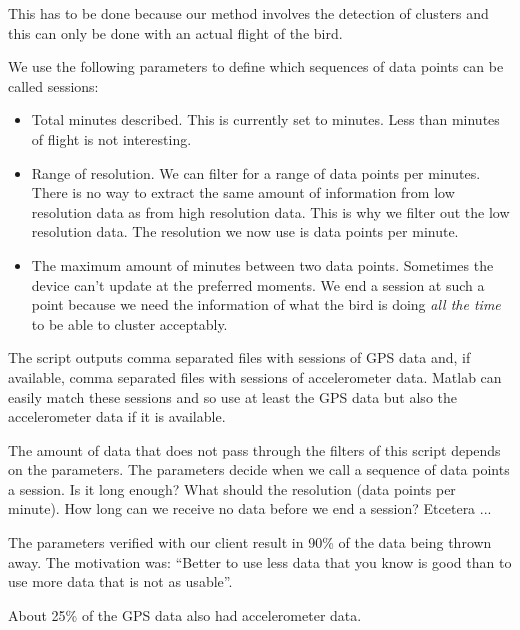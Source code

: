 This has to be done because our method involves the detection of clusters and this
can only be done with an actual flight of the bird. 

We use the following parameters to define which sequences of data points can be called sessions: 
\begin{itemize}
    \item Total minutes described. This is currently set to \minimumSessionLengthMinutes minutes. Less than \minimumSessionLengthMinutes minutes of flight is not interesting.
    \item Range of resolution. We can filter for a range of data points per minutes. There is
no way to extract the same amount of information from low resolution data as from high 
resolution data. This is why we filter out the low resolution data. The resolution 
we now use is \resolutionRange data points per minute.
    \item The maximum amount of minutes between two data points. Sometimes the device
can't update at the preferred moments. We end a session at such a point because we need
the information of what the bird is doing \emph{all the time} to be able to cluster 
acceptably. 
\end{itemize}

The script outputs comma separated files with sessions of GPS data and, if available, comma
separated files with sessions of accelerometer data. Matlab can easily match these sessions
and so use at least the GPS data but also the accelerometer data if it is available. 

The amount of data that does not pass through the filters of this script depends on the 
parameters. The parameters decide when we call a sequence of data points a session. Is
it long enough? What should the resolution (data points per minute). How long can we receive
no data before we end a session? Etcetera ...

The parameters verified with our client result in 90\% of the data being thrown away. 
The motivation was: ``Better to use less data that you know is good than to use more data that 
is not as usable''. 

About 25\% of the GPS data also had accelerometer data.



